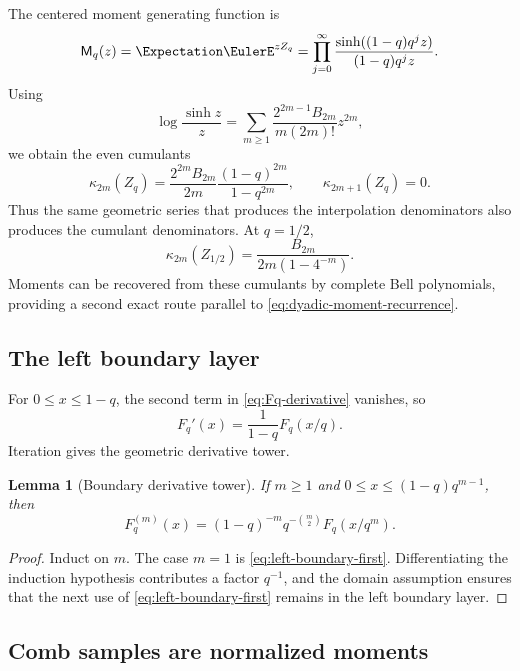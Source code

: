 \documentclass[11pt,a4paper,oneside]{article}
\newtheorem{lemma}[lemma]{Lemma}
\theoremstyle{definition}
\theoremstyle{remark}
\newcommand{\Mq}{\mathsf M_q}
\begin{document}
The centered moment generating function is
\begin{equation}
 \Mq(z)=\Expectation\EulerE^{zZ_q}
 =\prod_{j=0}^\infty
 \frac{\sinh((1-q)q^jz)}{(1-q)q^jz}.
 \label{eq:uq-mgf}
\end{equation}
Using
\[
 \log\frac{\sinh z}{z}
 =\sum_{m\ge1}\frac{2^{2m-1}B_{2m}}{m(2m)!}z^{2m},
\]
we obtain the even cumulants
\begin{equation}
 \kappa_{2m}(Z_q)
 =\frac{2^{2m}B_{2m}}{2m}
   \frac{(1-q)^{2m}}{1-q^{2m}},
 \qquad
 \kappa_{2m+1}(Z_q)=0.
 \label{eq:uq-cumulants}
\end{equation}
Thus the same geometric series that produces the interpolation denominators
also produces the cumulant denominators.  At $q=1/2$,
\begin{equation}
 \kappa_{2m}(Z_{1/2})
 =\frac{B_{2m}}{2m(1-4^{-m})}.
 \label{eq:up-cumulants}
\end{equation}
Moments can be recovered from these cumulants by complete Bell polynomials,
providing a second exact route parallel to \eqref{eq:dyadic-moment-recurrence}.

\subsection{The left boundary layer}

For $0\le x\le1-q$, the second term in \eqref{eq:Fq-derivative} vanishes, so
\begin{equation}
 F_q'(x)=\frac1{1-q}F_q(x/q).
 \label{eq:left-boundary-first}
\end{equation}
Iteration gives the geometric derivative tower.

\begin{lemma}[Boundary derivative tower]
\label{lem:boundary-tower}
If $m\ge1$ and $0\le x\le(1-q)q^{m-1}$, then
\begin{equation}
 F_q^{(m)}(x)
 =(1-q)^{-m}q^{-\binom m2}F_q(x/q^m).
 \label{eq:boundary-derivative-tower}
\end{equation}
\end{lemma}

\begin{proof}
Induct on $m$.  The case $m=1$ is
\eqref{eq:left-boundary-first}.  Differentiating the induction hypothesis
contributes a factor $q^{-1}$, and the domain assumption ensures that the next
use of \eqref{eq:left-boundary-first} remains in the left boundary layer.
\end{proof}

\subsection{Comb samples are normalized moments}
\end{document}
